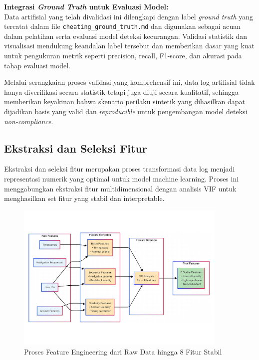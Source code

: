 \textbf{Integrasi \textit{Ground Truth} untuk Evaluasi Model:} \\
Data artifisial yang telah divalidasi ini dilengkapi dengan label \textit{ground truth} yang tercatat dalam file \texttt{cheating\_ground\_truth.md} dan digunakan sebagai acuan dalam pelatihan serta evaluasi model deteksi kecurangan. Validasi statistik dan visualisasi mendukung keandalan label tersebut dan memberikan dasar yang kuat untuk pengukuran metrik seperti precision, recall, F1-score, dan akurasi pada tahap evaluasi model.

Melalui serangkaian proses validasi yang komprehensif ini, data log artifisial tidak hanya diverifikasi secara statistik tetapi juga diuji secara kualitatif, sehingga memberikan keyakinan bahwa skenario perilaku sintetik yang dihasilkan dapat dijadikan basis yang valid dan \textit{reproducible} untuk pengembangan model deteksi \textit{non-compliance}.

\subsection{Ekstraksi dan Seleksi Fitur}
\label{sec:featureEngineering}
Ekstraksi dan seleksi fitur merupakan proses transformasi data log menjadi representasi numerik yang optimal untuk model machine learning. Proses ini menggabungkan ekstraksi fitur multidimensional dengan analisis VIF untuk menghasilkan set fitur yang stabil dan interpretable. 

\begin{figure}[htbp]
    \centering
    \includegraphics[width=0.9\textwidth]{figures/feature_engineering_process.pdf}
    \caption{Proses Feature Engineering dari Raw Data hingga 8 Fitur Stabil}
    \label{fig:feature_engineering_process}
\end{figure}

